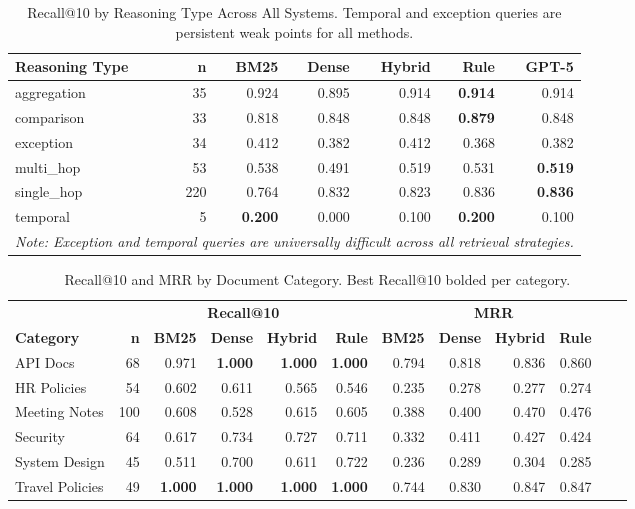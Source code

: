 \begin{table}[ht]
\centering
\caption{Recall@10 by Reasoning Type Across All Systems. Temporal and exception queries are persistent weak points for all methods.}
\label{tab:reasoning_type}
\begin{tabular}{lrrrrrr}
\toprule
\textbf{Reasoning Type} & \textbf{n} & \textbf{BM25} & \textbf{Dense} & \textbf{Hybrid} & \textbf{Rule} & \textbf{GPT-5} \\
\midrule
aggregation   & 35  & 0.924 & 0.895 & 0.914 & \textbf{0.914} & 0.914 \\
comparison    & 33  & 0.818 & 0.848 & 0.848 & \textbf{0.879} & 0.848 \\
exception     & 34  & 0.412 & 0.382 & 0.412 & 0.368 & 0.382 \\
multi\_hop    & 53  & 0.538 & 0.491 & 0.519 & 0.531 & \textbf{0.519} \\
single\_hop   & 220 & 0.764 & 0.832 & 0.823 & 0.836 & \textbf{0.836} \\
temporal      & 5   & \textbf{0.200} & 0.000 & 0.100 & \textbf{0.200} & 0.100 \\
\midrule
\multicolumn{7}{l}{\textit{Note: Exception and temporal queries are universally difficult across all retrieval strategies.}} \\
\bottomrule
\end{tabular}
\end{table}



\begin{table}[ht]
\centering
\caption{Recall@10 and MRR by Document Category. Best Recall@10 bolded per category.}
\label{tab:category}
\begin{tabular}{lrrrrrrrrrrr}
\toprule
 & \multicolumn{5}{c}{\textbf{Recall@10}} & \multicolumn{5}{c}{\textbf{MRR}} \\
\cmidrule(lr){2-6}\cmidrule(lr){7-11}
\textbf{Category} & \textbf{n} & \textbf{BM25} & \textbf{Dense} & \textbf{Hybrid} & \textbf{Rule} & \textbf{BM25} & \textbf{Dense} & \textbf{Hybrid} & \textbf{Rule} \\
\midrule
API Docs        & 68  & 0.971 & \textbf{1.000} & \textbf{1.000} & \textbf{1.000} & 0.794 & 0.818 & 0.836 & 0.860 \\
HR Policies     & 54  & 0.602 & 0.611 & 0.565 & 0.546 & 0.235 & 0.278 & 0.277 & 0.274 \\
Meeting Notes   & 100 & 0.608 & 0.528 & 0.615 & 0.605 & 0.388 & 0.400 & 0.470 & 0.476 \\
Security        & 64  & 0.617 & 0.734 & 0.727 & 0.711 & 0.332 & 0.411 & 0.427 & 0.424 \\
System Design   & 45  & 0.511 & 0.700 & 0.611 & 0.722 & 0.236 & 0.289 & 0.304 & 0.285 \\
Travel Policies & 49  & \textbf{1.000} & \textbf{1.000} & \textbf{1.000} & \textbf{1.000} & 0.744 & 0.830 & 0.847 & 0.847 \\
\bottomrule
\end{tabular}
\end{table}


